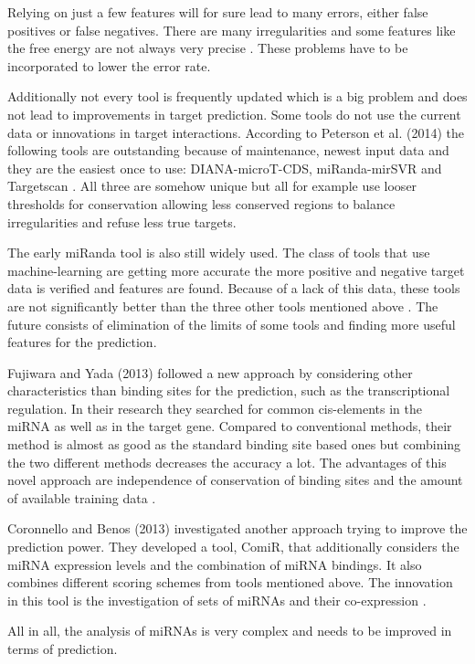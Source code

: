 \documentclass[12pt]{article}
\begin{document}
Relying on just a few features will for sure lead to many errors, either false positives or false negatives. There are many irregularities and some features like the free energy are not always very precise \cite{Peterson}. These problems have to be incorporated to lower the error rate.

Additionally not every tool is frequently updated which is a big problem and does not lead to improvements in target prediction. Some tools do not use the current data or innovations in target interactions. According to Peterson et al. (2014) the following tools are outstanding because of maintenance, newest input data and they are the easiest once to use: DIANA-microT-CDS, miRanda-mirSVR and Targetscan \cite{Peterson}. All three are somehow unique but all for example use looser thresholds for conservation allowing less conserved regions to balance irregularities and refuse less true targets.

The early miRanda tool is also still widely used. The class of tools that use machine-learning are getting more accurate the more positive and negative target data is verified and features are found. Because of a lack of this data, these tools are not significantly better than the three other tools mentioned above \cite{Peterson}.
The future consists of elimination of the limits of some tools and finding more useful features for the prediction.

Fujiwara and Yada (2013) followed a new approach by considering other characteristics than binding sites for the prediction, such as the transcriptional regulation. In their research they searched for common cis-elements in the miRNA as well as in the target gene. Compared to conventional methods, their method is almost as good as the standard binding site based ones but combining the two different methods decreases the accuracy a lot. The advantages of this novel approach are independence of conservation of binding sites and the amount of available training data \cite{Fuji}. 

Coronnello and Benos (2013) investigated another approach trying to improve the prediction power. They developed a tool, ComiR, that additionally considers the miRNA expression levels and the combination of miRNA bindings. It also combines different scoring schemes from tools mentioned above. The innovation in this tool is the investigation of sets of miRNAs and their co-expression \cite{Coronnello}. 

All in all, the analysis of miRNAs is very complex and needs to be improved in terms of prediction.


\newpage



\listoffigures


\listoftables




\end{document}
